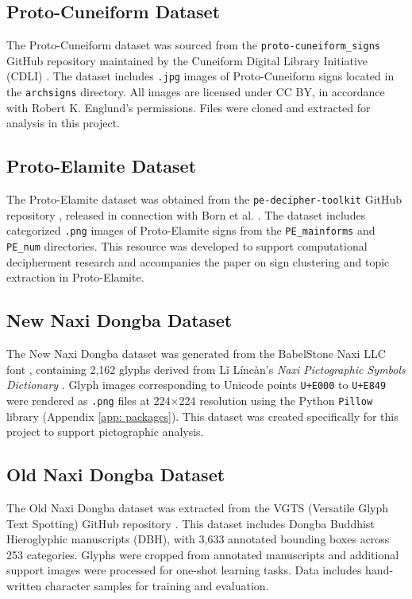 \documentclass[11pt,a4paper,oneside]{report}
\begin{document}
\subsection*{Proto-Cuneiform Dataset}
The Proto-Cuneiform dataset was sourced from the \texttt{proto-cuneiform\_signs} GitHub repository maintained by the Cuneiform Digital Library Initiative (CDLI) \cite{noauthor_cdli-ghproto-cuneiform_signs_2024}. The dataset includes \texttt{.jpg} images of Proto-Cuneiform signs located in the \texttt{archsigns} directory. All images are licensed under CC BY, in accordance with Robert K. Englund’s permissions. Files were cloned and extracted for analysis in this project.

\subsection*{Proto-Elamite Dataset}
The Proto-Elamite dataset was obtained from the \texttt{pe-decipher-toolkit} GitHub repository \cite{noauthor_sfu-natlangpe-decipher-toolkit_2023}, released in connection with Born et al. \cite{born_sign_2019}. The dataset includes categorized \texttt{.png} images of Proto-Elamite signs from the \texttt{PE\_mainforms} and \texttt{PE\_num} directories. This resource was developed to support computational decipherment research and accompanies the paper on sign clustering and topic extraction in Proto-Elamite.

\subsection*{New Naxi Dongba Dataset}
The New Naxi Dongba dataset was generated from the BabelStone Naxi LLC font \cite{noauthor_babelstone_nodate}, containing 2,162 glyphs derived from Lǐ Líncàn’s \textit{Naxi Pictographic Symbols Dictionary} \cite{li_dictionary_1944}. Glyph images corresponding to Unicode points \texttt{U+E000} to \texttt{U+E849} were rendered as \texttt{.png} files at 224$\times$224 resolution using the Python \texttt{Pillow} library (Appendix \ref{app: packages}). This dataset was created specifically for this project to support pictographic analysis.

\subsection*{Old Naxi Dongba Dataset}
The Old Naxi Dongba dataset was extracted from the VGTS (Versatile Glyph Text Spotting) GitHub repository \cite{wenbo_infinite-hwbvgts_2024}. This dataset includes Dongba Buddhist Hieroglyphic manuscripts (DBH), with 3,633 annotated bounding boxes across 253 categories. Glyphs were cropped from annotated manuscripts and additional support images were processed for one-shot learning tasks. Data includes hand-written character samples for training and evaluation.
\end{document}
